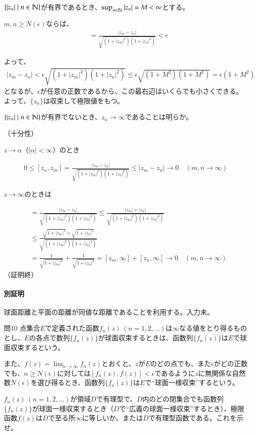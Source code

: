 $\{|z_n|\mid n\in\mathbb{N}\}$が有界であるとき、$\sup_{n\in\mathbb{N}}|z_n|=M<\infty$とする。

$m,n\ge N(\epsilon)$ならば、
\begin{align*}
    [z_m,z_n]
    &=\frac{|z_m-z_n|}{\sqrt{(1+|z_m|^2)(1+|z_n|^2)}}
    <\epsilon
\end{align*}

よって、
\begin{align*}
    |z_m-z_n|<\epsilon\sqrt{(1+|z_m|^2)(1+|z_n|^2)}
    \le\epsilon\sqrt{(1+M^2)(1+M^2)}=\epsilon(1+M^2)
\end{align*}
となるが、$\epsilon$が任意の正数であるから、この最右辺はいくらでも小さくできる。よって、$\{z_n\}$は収束して極限値をもつ。

$\{|z_n|\mid n\in\mathbb{N}\}$が有界でないとき、$z_n\longrightarrow\infty$であることは明らか。

（十分性）

$z\longrightarrow\alpha$（$|\alpha|<\infty$）のとき

\begin{align*}
    0\le[z_n,z_m]
    =\frac{|z_m-z_n|}{\sqrt{(1+|z_m|^2)(1+|z_n|^2)}}
    \le|z_m-z_n|\longrightarrow0\quad(m,n\longrightarrow\infty)
\end{align*}

$z\longrightarrow\infty$のときは

\begin{align*}
    [z_m,z_n]
    &=\frac{|z_m-z_n|}{\sqrt{(1+|z_m|^2)(1+|z_n|^2)}}
    \le\frac{|z_m|+|z_n|}{\sqrt{(1+|z_m|^2)(1+|z_n|^2)}}\\
    &\le\frac{\sqrt{1+|z_m|^2}+\sqrt{1+|z_n|^2}}{\sqrt{(1+|z_m|^2)(1+|z_n|^2)}}\\
    &=\frac{1}{\sqrt{1+|z_m|^2}}+\frac{1}{\sqrt{1+|z_n|^2}}
    =[z_m,\infty]+[z_n,\infty]\longrightarrow0
    \quad(m,n\longrightarrow\infty)
\end{align*}
（証明終）
\newpage
\paragraph{別証明}
球面距離と平面の距離が同値な距離であることを利用する。入力未。

\newpage
\begin{mysimplebox}{問10}
    点集合$E$で定義された函数$f_n(z)\ (n=1,2,\dots)$は$\infty$なる値をとり得るものとし、$E$の各点で数列$\{f_n(z)\}$が球面収束するときは、函数列$\{f_n(z)\}$は$E$で球面収束するという。

    また、$f(z)=\lim_{n\to\infty}f_n(z)$とおくと、$z$が$E$のどの点でも、また$\epsilon$がどの正数でも、$n\ge N(\epsilon)$に対しては$[f_n(z),f(z)]<\epsilon$であるように$z$に無関係な自然数$N(\epsilon)$を選び得るとき、函数列$\{f_n(z)\}$は$E$で``球面一様収束''するという。

    $f_n(z)\ (n=1,2,\dots)$が領域$D$で有理型で、$D$内のどの閉集合でも函数列$\{f_n(z)\}$が球面一様収束するとき（$D$で``広義の球面一様収束''するとき）、極限函数$f(z)$は$D$で至る所$\infty$に等しいか、または$D$で有理型函数である。これを示せ。
\end{mysimplebox}
